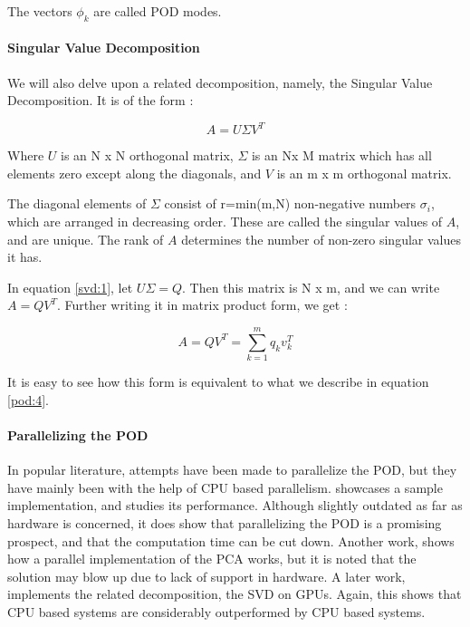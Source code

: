 \documentclass[submit]{aiaa-tc_mod}%
\begin{document}
The vectors $\phi_k$ are called POD modes.

\paragraph{Singular Value Decomposition}

We will also delve upon a related decomposition, namely, the Singular Value Decomposition. It is of the form : 

\begin{equation}
A = U\Sigma V^T
\label{svd:1}
\end{equation}

Where $U$ is an N x N orthogonal matrix, $\Sigma$ is an Nx M matrix which has all elements zero except along the diagonals, and $V$ is an m x m orthogonal matrix. 

The diagonal elements of $\Sigma$ consist of r=min(m,N) non-negative numbers $\sigma_i$, which are arranged in decreasing order. These are called the singular values of $A$, and are unique. The rank of $A$ determines the number of non-zero singular values it has. 


In equation \ref{svd:1}, let $U\Sigma = Q$. Then this matrix is N x m, and we can write $A = Q V^T$. Further writing it in matrix product form, we get :

\begin{equation}
A = QV^T = \sum^m_{k=1} q_k v^{T}_k
\label{svd:2}
\end{equation}

It is easy to see how this form is equivalent to what we describe in equation \ref{pod:4}.


\paragraph{Parallelizing the POD}

In popular literature, attempts have been made to parallelize the POD, but they have mainly been with the help of CPU based parallelism. \cite{alfonsi} showcases a sample implementation, and studies its performance. Although slightly outdated as far as hardware is concerned, it does show that parallelizing the POD is a promising prospect, and that the computation time can be cut down. Another work, \cite{andrecut} shows how a parallel implementation of the PCA works, but it is noted that the solution may blow up due to lack of support in hardware. A later work, \cite{iiith} implements the related decomposition, the SVD on GPUs. Again, this shows that CPU based systems are considerably outperformed by CPU based systems. 
\end{document}
